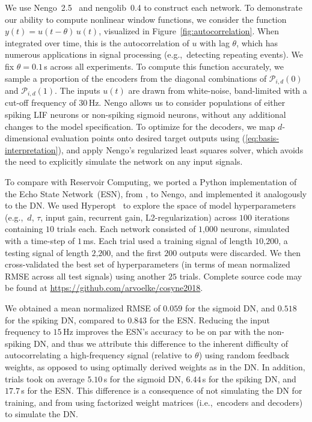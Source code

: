 \documentclass[12pt, a4paper]{article}
\begin{document}
We use Nengo~2.5~\citep{bekolay2014} and nengolib~0.4 %
to construct each network.
To demonstrate our ability to compute nonlinear window functions, we consider the function $y(t) = u(t - \theta)\, u(t)$, visualized in Figure~\ref{fig:autocorrelation}.
When integrated over time, this is the autocorrelation of $u$ with lag $\theta$, which has numerous applications in signal processing (e.g.,~detecting repeating events).
We fix $\theta = 0.1$\,s across all experiments.
To compute this function accurately, we sample a proportion of the encoders from the diagonal combinations of $\mathcal{P}_{i, d}(0)$ and $\mathcal{P}_{i, d}(1)$.
The inputs $u(t)$ are drawn from white-noise, band-limited with a cut-off frequency of $30$\,Hz.
Nengo allows us to consider populations of either spiking LIF neurons or non-spiking sigmoid neurons, without any additional changes to the model specification.
To optimize for the decoders, we map $d$-dimensional evaluation points onto desired target outputs using (\ref{eq:basis-interpretation}), and apply Nengo's regularized least squares solver, which avoids the need to explicitly simulate the network on any input signals.

To compare with Reservoir Computing, we ported a Python implementation of the Echo State Network~(ESN), from \cite{lukovsevivcius2009reservoir}, to Nengo, and implemented it analogously to the DN.
We used Hyperopt~\citep{bergstra2015hyperopt} to explore the space of model hyperparameters (e.g.,~$d$, $\tau$, input gain, recurrent gain, L2-regularization) across $100$ iterations containing $10$ trials each.
Each network consisted of $1\text{,}000$ neurons, simulated with a time-step of $1$\,ms.
Each trial used a training signal of length $10\text{,}200$, a testing signal of length $2\text{,}200$, and the first $200$ outputs were discarded.
We then cross-validated the best set of hyperparameters (in terms of mean normalized RMSE across all test signals) using another $25$ trials.
Complete source code may be found at \url{https://github.com/arvoelke/cosyne2018}.

We obtained a mean normalized RMSE of $0.059$ for the sigmoid DN, and $0.518$ for the spiking DN, compared to $0.843$ for the ESN.
Reducing the input frequency to $15$\,Hz improves the ESN's accuracy to be on par with the non-spiking DN, and thus we attribute this difference to the inherent difficulty of autocorrelating a high-frequency signal (relative to $\theta$) using random feedback weights, as opposed to using optimally derived weights as in the DN.
In addition, trials took on average $5.10$\,s for the sigmoid DN, $6.44$\,s for the spiking DN, and $17.7$\,s for the ESN.
This difference is a consequence of not simulating the DN for training, and from using factorized weight matrices (i.e.,~encoders and decoders) to simulate the DN.
\end{document}
